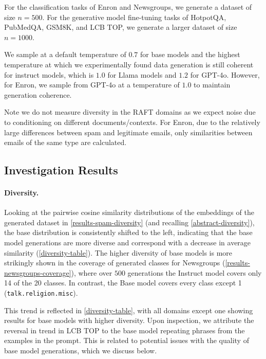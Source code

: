 For the classification tasks of Enron and Newsgroups, we generate a dataset of size $n=500$. For the generative model fine-tuning tasks of HotpotQA, PubMedQA, GSM8K, and LCB TOP, we generate a larger dataset of size $n=1000$.

We sample at a default temperature of $0.7$ for base models and the highest temperature at which we experimentally found data generation is still coherent for instruct models, which is $1.0$ for Llama models and $1.2$ for GPT-4o. However, for Enron, we sample from GPT-4o at a temperature of $1.0$ to maintain generation coherence.

Note we do not measure diversity in the RAFT domains as we expect noise due to conditioning on different documents/contexts. For Enron, due to the relatively large differences between spam and legitimate emails, only similarities between emails of the same type are calculated.

\subsection{Investigation Results}
\label{qd-investigation-results}




\paragraph{Diversity.} Looking at the pairwise cosine similarity distributions of the embeddings of the generated dataset in \cref{results-spam-diversity} (and recalling \cref{abstract-diversity}), the base distribution is consistently shifted to the left, indicating that the base model generations are more diverse and correspond with a decrease in average similarity (\cref{diversity-table}). The higher diversity of base models is more strikingly shown in the coverage of generated classes for Newsgroups (\cref{results-newsgroups-coverage}), where over $500$ generations the Instruct model covers only 14 of the 20 classes. In contrast, the Base model covers every class except 1 (\texttt{talk.religion.misc}).



This trend is reflected in \cref{diversity-table}, with all domains except one showing results for base models with higher diversity. Upon inspection, we attribute the reversal in trend in LCB TOP to the base model repeating phrases from the examples in the prompt. This is related to potential issues with the quality of base model generations, which we discuss below.

